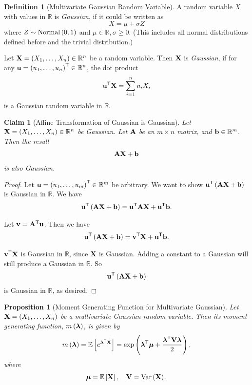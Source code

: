 \documentclass{article}
\newtheorem{proposition}[theorem]{Proposition}
\newtheorem{claim}[theorem]{Claim}
\theoremstyle{definition}
\newtheorem{definition}[theorem]{Definition}
\theoremstyle{remark}
\newcommand{\RR}{\mathbb{R}}
\newcommand{\Expt}{\mathbb{E}}
\newcommand{\transpose}{^{\mathsf{T}}}
\newcommand{\Var}{\operatorname{Var}}
\newcommand{\Normal}{\operatorname{Normal}}
\begin{document}
\begin{definition}[Multivariate Gaussian Random Variable]
    \label{def:multivariate-gaussian-rv}%
    A random variable \(X\) with values in \(\RR\) is \emph{Gaussian}, if it could be written as
    \[
        X = \mu + \sigma Z
    \]
    where \(Z \sim \Normal\pqty{0, 1}\) and \(\mu \in \RR, \sigma \geq 0\). (This includes all normal distributions defined before and the trivial distribution.)

    Let \(\vb{X} = \pqty{X_1, \ldots, X_n} \in \RR^n\) be a random variable. Then \(\vb{X}\) is \emph{Gaussian}, if for any \(\vb{u} = \pqty{u_1, \ldots, u_n}\transpose \in \RR^n\), the dot product
    \[
        \vb{u}\transpose \vb{X} = \sum_{i = 1}^{n} u_i X_i
    \]
    is a Gaussian random variable in \(\RR\).
\end{definition}

\begin{claim}[Affine Transformation of Gaussian is Gaussian]
    \label{claim:affine-transformation-preserves-gaussian}%
    Let \(\vb{X} = \pqty{X_1, \ldots, X_n} \in \RR^n\) be Gaussian. Let \(\vb{A}\) be an \(m \times n\) matrix, and \(\vb{b} \in \RR^m\). Then the result
    \[
        \vb{A} \vb{X} + \vb{b}
    \]
    is also Gaussian.
\end{claim}

\begin{proof}
    Let \(\vb{u} = \pqty{u_1, \ldots, u_m} \transpose \in \RR^m\) be arbitrary. We want to show \(\vb{u}\transpose \pqty{\vb{A} \vb{X} + \vb{b}}\) is Gaussian in \(\RR\). We have
    \[
        \vb{u}\transpose \pqty{\vb{A} \vb{X} + \vb{b}} = \vb{u}\transpose \vb{A} \vb{X} + \vb{u}\transpose \vb{b}.
    \]

    Let \(\vb{v} = \vb{A}\transpose \vb{u}\). Then we have
    \[
        \vb{u}\transpose \pqty{\vb{A} \vb{X} + \vb{b}} = \vb{v}\transpose \vb{X} + \vb{u}\transpose \vb{b}.
    \]

    \(\vb{v}\transpose \vb{X}\) is Gaussian in \(\RR\), since \(\vb{X}\) is Gaussian. Adding a constant to a Gaussian will still produce a Gaussian in \(\RR\). So
    \[
        \vb{u}\transpose \pqty{\vb{A} \vb{X} + \vb{b}}
    \]
    is Gaussian in \(\RR\), as desired.
\end{proof}

\begin{proposition}[Moment Generating Function for Multivariate Gaussian]
    \label{prop:mgf-multivariate-gaussian}%
    Let \(\vb{X} = \pqty{X_1, \ldots, X_n}\) be a multivariate Gaussian random variable. Then its moment generating function, \(m\pqty{\vb*{\lambda}}\), is given by
    \[
        m\pqty{\vb*{\lambda}} = \Expt\bqty{e^{\vb*{\lambda} \transpose \vb{X}}} = \exp\pqty{\vb*{\lambda} \transpose \vb*{\mu} + \frac{\vb*{\lambda} \transpose \vb{V} \vb*{\lambda}}{2}},
    \]
    where
    \[
        \vb*{\mu} = \Expt\bqty{\vb{X}}, \quad \vb{V} = \Var\pqty{\vb{X}}.
    \]
\end{proposition}
\end{document}
